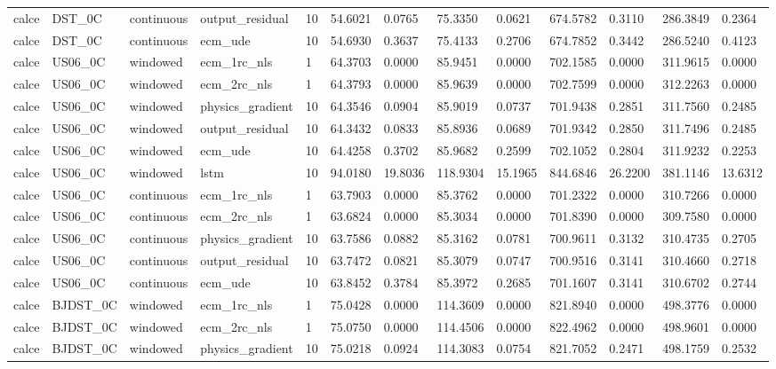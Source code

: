 \begin{tabular}{lllllllllllll}
calce & DST\_0C & continuous & output\_residual & 10 & 54.6021 & 0.0765 & 75.3350 & 0.0621 & 674.5782 & 0.3110 & 286.3849 & 0.2364 \\
calce & DST\_0C & continuous & ecm\_ude & 10 & 54.6930 & 0.3637 & 75.4133 & 0.2706 & 674.7852 & 0.3442 & 286.5240 & 0.4123 \\
calce & US06\_0C & windowed & ecm\_1rc\_nls & 1 & 64.3703 & 0.0000 & 85.9451 & 0.0000 & 702.1585 & 0.0000 & 311.9615 & 0.0000 \\
calce & US06\_0C & windowed & ecm\_2rc\_nls & 1 & 64.3793 & 0.0000 & 85.9639 & 0.0000 & 702.7599 & 0.0000 & 312.2263 & 0.0000 \\
calce & US06\_0C & windowed & physics\_gradient & 10 & 64.3546 & 0.0904 & 85.9019 & 0.0737 & 701.9438 & 0.2851 & 311.7560 & 0.2485 \\
calce & US06\_0C & windowed & output\_residual & 10 & 64.3432 & 0.0833 & 85.8936 & 0.0689 & 701.9342 & 0.2850 & 311.7496 & 0.2485 \\
calce & US06\_0C & windowed & ecm\_ude & 10 & 64.4258 & 0.3702 & 85.9682 & 0.2599 & 702.1052 & 0.2804 & 311.9232 & 0.2253 \\
calce & US06\_0C & windowed & lstm & 10 & 94.0180 & 19.8036 & 118.9304 & 15.1965 & 844.6846 & 26.2200 & 381.1146 & 13.6312 \\
calce & US06\_0C & continuous & ecm\_1rc\_nls & 1 & 63.7903 & 0.0000 & 85.3762 & 0.0000 & 701.2322 & 0.0000 & 310.7266 & 0.0000 \\
calce & US06\_0C & continuous & ecm\_2rc\_nls & 1 & 63.6824 & 0.0000 & 85.3034 & 0.0000 & 701.8390 & 0.0000 & 309.7580 & 0.0000 \\
calce & US06\_0C & continuous & physics\_gradient & 10 & 63.7586 & 0.0882 & 85.3162 & 0.0781 & 700.9611 & 0.3132 & 310.4735 & 0.2705 \\
calce & US06\_0C & continuous & output\_residual & 10 & 63.7472 & 0.0821 & 85.3079 & 0.0747 & 700.9516 & 0.3141 & 310.4660 & 0.2718 \\
calce & US06\_0C & continuous & ecm\_ude & 10 & 63.8452 & 0.3784 & 85.3972 & 0.2685 & 701.1607 & 0.3141 & 310.6702 & 0.2744 \\
calce & BJDST\_0C & windowed & ecm\_1rc\_nls & 1 & 75.0428 & 0.0000 & 114.3609 & 0.0000 & 821.8940 & 0.0000 & 498.3776 & 0.0000 \\
calce & BJDST\_0C & windowed & ecm\_2rc\_nls & 1 & 75.0750 & 0.0000 & 114.4506 & 0.0000 & 822.4962 & 0.0000 & 498.9601 & 0.0000 \\
calce & BJDST\_0C & windowed & physics\_gradient & 10 & 75.0218 & 0.0924 & 114.3083 & 0.0754 & 821.7052 & 0.2471 & 498.1759 & 0.2532 \\

\end{tabular}
